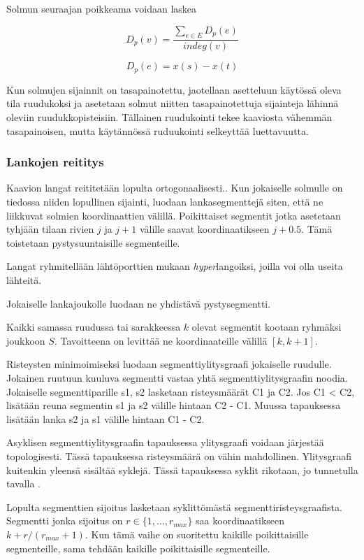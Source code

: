 \documentclass[finnish,12pt]{article}
\begin{document}
Solmun seuraajan poikkeama voidaan laskea 

$$
D_p(v)=\frac{\sum_{e \in E}D_p(e)}{indeg(v)}
$$

$$
D_p(e) = x(s) - x(t)
$$

Kun solmujen sijainnit on tasapainotettu, jaotellaan asetteluun käytössä oleva tila ruudukoksi ja asetetaan solmut niitten tasapainotettuja sijainteja lähinnä oleviin ruudukkopisteisiin.
Tällainen ruudukointi tekee kaaviosta vähemmän tasapainoisen, mutta käytännössä ruduukointi selkeyttää luettavuutta.

\cite{RefWorks:49}


		\subsubsection{Lankojen reititys}


Kaavion langat reititetään lopulta ortogonaalisesti..\cite{RefWorks:17}
Kun jokaiselle solmulle on tiedossa niiden lopullinen sijainti, luodaan lankasegmenttejä siten, että ne liikkuvat solmien koordinaattien välillä.
Poikittaiset segmentit jotka asetetaan tyhjään tilaan rivien $j$ ja $j+1$ välille saavat koordinaatikseen $j+0.5$.
Tämä toistetaan pystysuuntaisille segmenteille.

Langat ryhmitellään lähtöporttien mukaan \emph{hyper}langoiksi, joilla voi olla useita lähteitä.

Jokaiselle lankajoukolle luodaan ne yhdistävä pystysegmentti.

Kaikki samassa ruudussa tai sarakkeessa $k$ olevat segmentit kootaan ryhmäksi joukkoon $S$.
Tavoitteena on levittää ne koordinaateille välillä $[k, k+1]$.

Risteysten minimoimiseksi luodaan segmenttiylitysgraafi jokaiselle ruudulle.
Jokainen ruutuun kuuluva segmentti vastaa yhtä segmenttiylitysgraafin noodia.
Jokaiselle segmenttiparille s1, s2 lasketaan risteysmäärät C1 ja C2. Jos C1 < C2, lisätään reuna segmentin s1 ja s2 välille hintaan C2 - C1. Muussa tapauksessa lisätään lanka s2 ja s1 välille hintaan C1 - C2.

Asyklisen segmenttiylitysgraafin tapauksessa ylitysgraafi voidaan järjestää topologisesti.
Tässä tapauksessa risteysmäärä on vähin mahdollinen.
Ylitysgraafi kuitenkin yleensä sisältää syklejä. Tässä tapauksessa syklit rikotaan, jo tunnetulla tavalla \cite{RefWorks:48}.

Lopulta segmenttien sijoitus lasketaan syklittömästä segmenttiristeysgraafista.
Segmentti jonka sijoitus on $r \in \{1,...,r_{max}\}$ saa koordinaatikseen $k + r/(r_{max} +1)$.
Kun tämä vaihe on suoritettu kaikille poikittaisille segmenteille, sama tehdään kaikille poikittaisille segmenteille.
\end{document}
